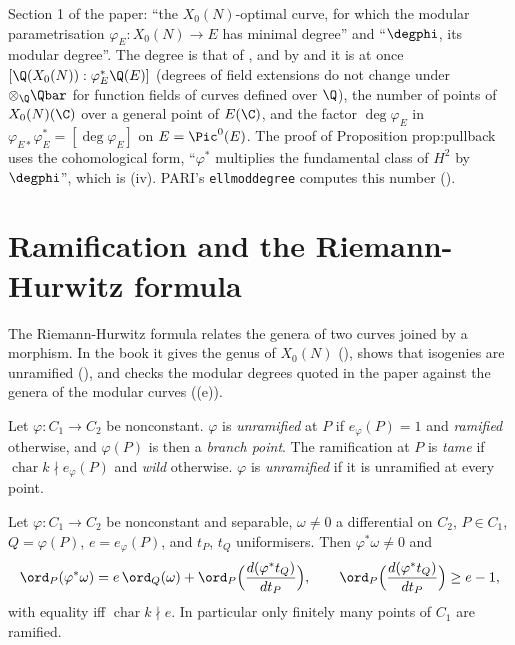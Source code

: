 \begin{paperlink}\label{pl:curves:modular-degree}
Section 1 of the paper: ``the $X_0(N)$-optimal curve, for which the modular parametrisation $\varphi_E\colon X_0(N)\to E$ has minimal degree'' and
``$\degphi$, its modular degree''. The degree is that of , and by  and
 it is at once $[\Q(X_0(N)):\varphi_E^*\Q(E)]$ (degrees of field extensions do not change under $\otimes_\Q\Qbar$ for function fields
of curves defined over $\Q$), the number of points of $X_0(N)(\C)$ over a general point of $E(\C)$, and the factor $\deg\varphi_E$ in
$\varphi_{E*}\varphi_E^*=[\deg\varphi_E]$ on $E=\Pic^0(E)$. The proof of Proposition prop:pullback uses the cohomological form, ``$\varphi^*$ multiplies the fundamental
class of $H^2$ by $\degphi$'', which is (iv). PARI's \texttt{ellmoddegree} computes this number ().
\end{paperlink}

\section{Ramification and the Riemann-Hurwitz formula}\label{sec:curves:hurwitz}

The Riemann-Hurwitz formula relates the genera of two curves joined by a morphism. In the book it gives the genus of $X_0(N)$ (), shows that
isogenies are unramified (), and checks the modular degrees quoted in the paper against the genera of the modular curves
((e)).

\begin{definition}[ramification]\label{def:curves:ramification}
Let $\varphi\colon C_1\to C_2$ be nonconstant. $\varphi$ is \emph{unramified} at $P$ if $e_\varphi(P)=1$ and \emph{ramified} otherwise, and $\varphi(P)$ is then a \emph{branch
point}. The ramification at $P$ is \emph{tame} if $\operatorname{char}k\nmid e_\varphi(P)$ and \emph{wild} otherwise. $\varphi$ is \emph{unramified} if it is unramified at every point.
\end{definition}

\begin{lemma}\label{lem:curves:local-differential}
Let $\varphi\colon C_1\to C_2$ be nonconstant and separable, $\omega\ne0$ a differential on $C_2$, $P\in C_1$, $Q=\varphi(P)$, $e=e_\varphi(P)$, and $t_P$, $t_Q$ uniformisers. Then
$\varphi^*\omega\ne0$ and
\[
\ord_P(\varphi^*\omega)=e\,\ord_Q(\omega)+\ord_P\Bigl(\frac{d(\varphi^*t_Q)}{dt_P}\Bigr),\qquad \ord_P\Bigl(\frac{d(\varphi^*t_Q)}{dt_P}\Bigr)\ge e-1,
\]
with equality iff $\operatorname{char}k\nmid e$. In particular only finitely many points of $C_1$ are ramified.
\end{lemma}

